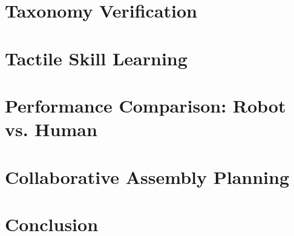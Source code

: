 
\section{Taxonomy Verification}\label{ch:experiments:taxonomy}

\section{Tactile Skill Learning}\label{ch:experiments:learning}

\section{Performance Comparison: Robot vs. Human}\label{ch:experiments:comparison}

\section{Collaborative Assembly Planning}\label{ch:experiments:planning}

\section{Conclusion}\label{ch:experiments:conclusion}
